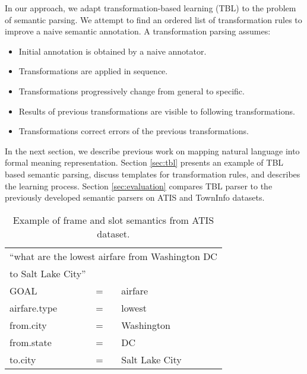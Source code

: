 \documentclass{article}
\begin{document}

In our approach, we adapt transformation-based learning (TBL) \cite{brill95} to the problem of semantic parsing. We attempt to find an ordered list of transformation rules to improve a naive semantic annotation. A transformation parsing assumes:
\begin{itemize}
\item Initial annotation is obtained by a naive annotator.
\item Transformations are applied in sequence. 
\item Transformations progressively change from general to specific.
\item Results of previous transformations are visible to following transformations.
\item Transformations correct errors of the previous transformations.
\end{itemize} 

In the next section, we describe previous work on mapping natural language into formal meaning representation. Section \ref{sec:tbl} presents an example of TBL based semantic parsing, discuss templates for transformation rules, and describes the learning process. Section \ref{sec:evaluation} compares TBL parser to the previously developed semantic parsers on ATIS \cite{atis94} and TownInfo \cite{mairesse09} datasets.

\begin{table}
\begin{center}
\begin{small}\begin{tabular}{|lll|} 
  \hline
  \multicolumn{3}{l}{``what are the lowest airfare from Washington DC} \\
  \multicolumn{3}{l}{to Salt Lake City''} \\
  \hline
  GOAL          & = & airfare \\
  airfare.type  & = & lowest \\
  from.city     & = & Washington \\
  from.state    & = & DC \\
  to.city       & = & Salt Lake City \\
  \hline
\end{tabular} 
\end{small}\end{center}
\caption{Example of frame and slot semantics from ATIS \cite{atis94} dataset.}
\label{tbl:sem:example}
\end{table}
\end{document}
